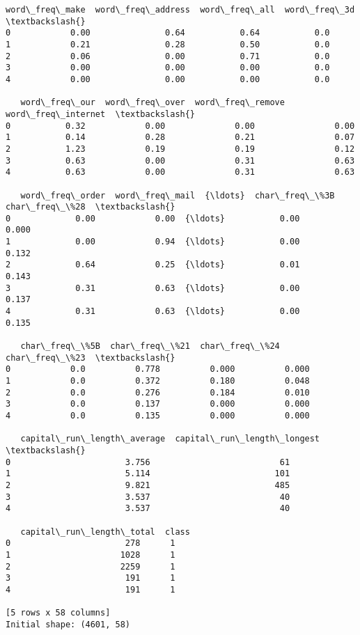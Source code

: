 \documentclass[11pt]{article}
\begin{document}
    \begin{Verbatim}[commandchars=\\\{\}]
   word\_freq\_make  word\_freq\_address  word\_freq\_all  word\_freq\_3d  \textbackslash{}
0            0.00               0.64           0.64           0.0
1            0.21               0.28           0.50           0.0
2            0.06               0.00           0.71           0.0
3            0.00               0.00           0.00           0.0
4            0.00               0.00           0.00           0.0

   word\_freq\_our  word\_freq\_over  word\_freq\_remove  word\_freq\_internet  \textbackslash{}
0           0.32            0.00              0.00                0.00
1           0.14            0.28              0.21                0.07
2           1.23            0.19              0.19                0.12
3           0.63            0.00              0.31                0.63
4           0.63            0.00              0.31                0.63

   word\_freq\_order  word\_freq\_mail  {\ldots}  char\_freq\_\%3B  char\_freq\_\%28  \textbackslash{}
0             0.00            0.00  {\ldots}           0.00          0.000
1             0.00            0.94  {\ldots}           0.00          0.132
2             0.64            0.25  {\ldots}           0.01          0.143
3             0.31            0.63  {\ldots}           0.00          0.137
4             0.31            0.63  {\ldots}           0.00          0.135

   char\_freq\_\%5B  char\_freq\_\%21  char\_freq\_\%24  char\_freq\_\%23  \textbackslash{}
0            0.0          0.778          0.000          0.000
1            0.0          0.372          0.180          0.048
2            0.0          0.276          0.184          0.010
3            0.0          0.137          0.000          0.000
4            0.0          0.135          0.000          0.000

   capital\_run\_length\_average  capital\_run\_length\_longest  \textbackslash{}
0                       3.756                          61
1                       5.114                         101
2                       9.821                         485
3                       3.537                          40
4                       3.537                          40

   capital\_run\_length\_total  class
0                       278      1
1                      1028      1
2                      2259      1
3                       191      1
4                       191      1

[5 rows x 58 columns]
Initial shape: (4601, 58)
    \end{Verbatim}
    
\end{document}
